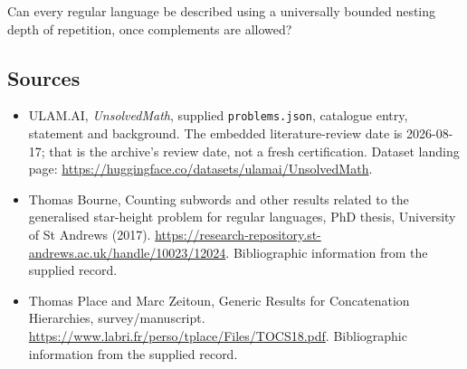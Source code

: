 \documentclass[11pt,a4paper]{article}
\begin{document}
Can every regular language be described using a universally bounded nesting depth of repetition, once complements are allowed?

\subsection{Sources}

{\small

\begin{itemize}

\item[\hypertarget{source:statement:1}{S1}] ULAM.AI, \emph{UnsolvedMath}, supplied \texttt{problems.json}, catalogue entry, statement and background. The embedded literature-review date is 2026-08-17; that is the archive’s review date, not a fresh certification. Dataset landing page: \url{https://huggingface.co/datasets/ulamai/UnsolvedMath}.

\item[\hypertarget{source:statement:2}{S2}] Thomas Bourne, Counting subwords and other results related to the generalised star-height problem for regular languages, PhD thesis, University of St Andrews (2017). \url{https://research-repository.st-andrews.ac.uk/handle/10023/12024}. Bibliographic information from the supplied record.

\item[\hypertarget{source:statement:3}{S3}] Thomas Place and Marc Zeitoun, Generic Results for Concatenation Hierarchies, survey/manuscript. \url{https://www.labri.fr/perso/tplace/Files/TOCS18.pdf}. Bibliographic information from the supplied record.

\end{itemize}

}

\label{end:statement}
\end{document}

